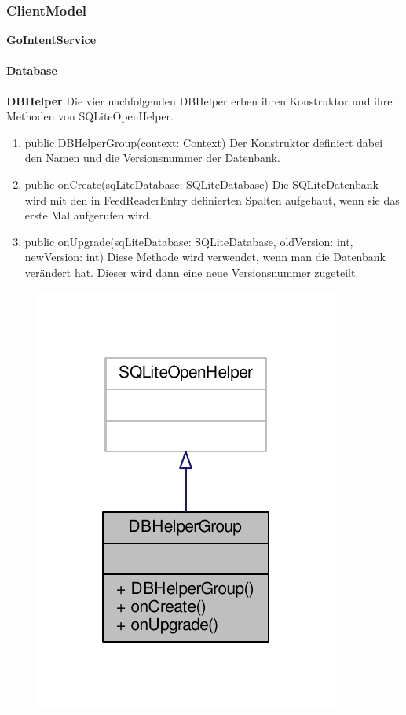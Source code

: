\subsubsection{ClientModel}

\textbf{GoIntentService}

\paragraph{Database}

\textbf{DBHelper}
Die vier nachfolgenden DBHelper erben ihren Konstruktor und ihre Methoden von SQLiteOpenHelper. 
\begin{enumerate}
	\item public DBHelperGroup(context: Context)
		Der Konstruktor definiert dabei den Namen und die Versionsnummer der Datenbank.
	\item public onCreate(sqLiteDatabase: SQLiteDatabase)
		Die SQLiteDatenbank wird mit den in FeedReaderEntry definierten Spalten aufgebaut, wenn sie das erste Mal aufgerufen wird.
	\item public onUpgrade(sqLiteDatabase: SQLiteDatabase, oldVersion: int, newVersion: int)
		Diese Methode wird verwendet, wenn man die Datenbank verändert hat. Dieser wird dann eine neue Versionsnummer zugeteilt.	
\end{enumerate}
\begin{figure}[H]
	\includegraphics[scale = 1]{res/umlClasses/d_b_helper_group__coll__graph.pdf}
	\centering	
\end{figure}


